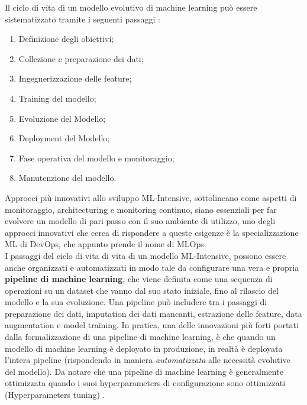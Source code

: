 Il ciclo di vita di un modello evolutivo di machine learning può essere sistematizzato tramite i seguenti passaggi \cite{burkov2020machine}:

\begin{enumerate}
    \item Definizione degli obiettivi;
    \item Collezione e preparazione dei dati;
    \item Ingegnerizzazione delle feature;
    \item Training del modello;
    \item Evoluzione del Modello;
    \item Deployment del Modello;
    \item Fase operativa del modello e monitoraggio;
    \item Manutenzione del modello.
\end{enumerate}

Approcci più innovativi allo sviluppo ML-Intensive, sottolineano come aspetti di monitoraggio, architecturing e monitoring continuo, siano essenziali per far evolvere un modello di pari passo con il suo ambiente di utilizzo, uno degli approcci innovativi che cerca di rispondere a queste esigenze è la specializzazione ML di DevOps, che appunto prende il nome di MLOps.\\

I passaggi del ciclo di vita di vita di un modello ML-Intensive, possono essere anche organizzati e automatizzati in modo tale da configurare una vera e propria \textbf{pipeline di machine learning}, che viene definita come una sequenza di operazioni su un dataset che vanno dal suo stato iniziale, fino al rilascio del modello e la sua evoluzione. Una pipeline può includere tra i passaggi di preparazione dei dati, imputation dei dati mancanti, estrazione delle feature, data augmentation e model training\cite{burkov2020machine}. In pratica, una delle innovazioni più forti portati dalla formalizzazione di una pipeline di machine learning, è che quando un modello di machine learning è deployato in produzione, in realtà è deployata l'intera pipeline\cite{burkov2020machine} (rispondendo in maniera \emph{automatizzata} alle necessità evolutive del modello). Da notare che una pipeline di machine learning è generalmente ottimizzata quando i suoi hyperparameters di configurazione sono ottimizzati (Hyperparameters tuning) \cite{burkov2020machine}.

